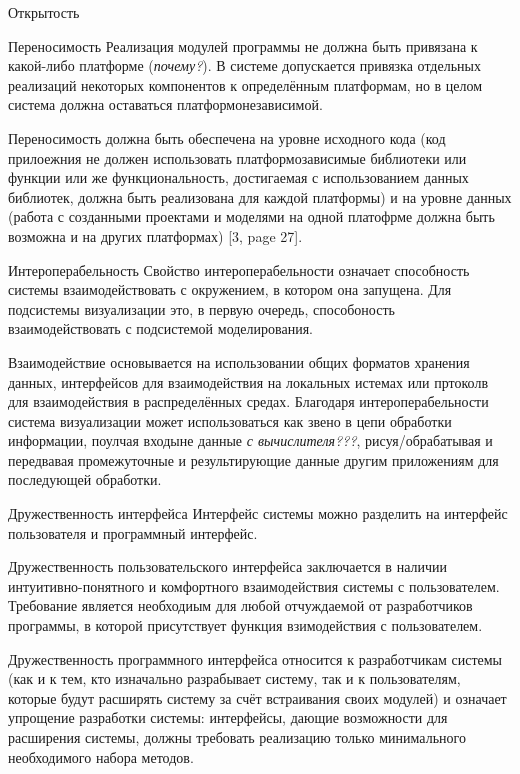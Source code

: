 \documentclass[a4paper,12pt]{extarticle}
\begin{document}
\begin{subsection}{Открытость}
    \begin{subsubsection}{Переносимость}
        Реализация модулей программы не должна быть привязана к какой-либо платформе (\textit{почему?}). В системе допускается привязка отдельных реализаций некоторых компонентов к определённым платформам, но в целом система должна оставаться платформонезависимой.
        
        Переносимость должна быть обеспечена на уровне исходного кода (код прилоежния не должен использовать платформозависимые библиотеки или функции или же функциональность, достигаемая с использованием данных библиотек, должна быть реализована для каждой платформы) и на уровне данных (работа с созданными проектами и моделями на одной платофрме должна быть возможна и на других платформах) [3, page 27].
    \end{subsubsection}
        
    \begin{subsubsection}{Интероперабельность}
        Свойство интероперабельности означает способность системы взаимодействовать с окружением, в котором она запущена. Для подсистемы визуализации это, в первую очередь, способоность взаимодействовать с подсистемой моделирования.
        
        Взаимодействие основывается на использовании общих форматов хранения данных, интерфейсов для взаимодействия на локальных истемах или пртоколв для взаимодействия в распределённых средах. Благодаря интероперабельности система визуализации может использоваться как звено в цепи обработки информации, поулчая входыне данные \textit{с вычислителя???}, рисуя/обрабатывая и передвавая промежуточные и результирующие данные другим приложениям для последующей обработки.
    \end{subsubsection}
        
    \begin{subsubsection}{Дружественность интерфейса}
        Интерфейс системы можно разделить на интерфейс пользователя и программный интерфейс.
        
        Дружественность пользовательского интерфейса заключается в наличии интуитивно-понятного и комфортного взаимодействия системы с пользователем. Требование является необходиым для любой отчуждаемой от разработчиков программы, в которой присутствует функция взимодействия с пользователем.
        
        Дружественность программного интерфейса относится к разработчикам системы (как и к тем, кто изначально разрабывает систему, так и к пользователям, которые будут расширять систему за счёт встраивания своих модулей) и означает упрощение разработки системы: интерфейсы, дающие возможности для расширения системы, должны требовать реализацию только минимального необходимого набора методов.
    \end{subsubsection}

\end{subsection}
\end{document}

